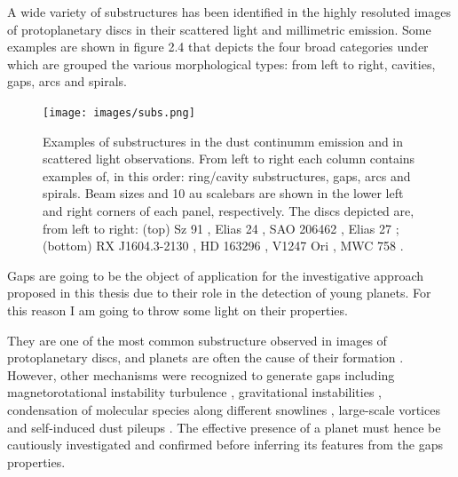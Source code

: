 \documentclass[a4paper,10pt]{report}
\begin{document}

A wide variety of substructures has been identified in the highly resoluted images
of protoplanetary discs in their scattered light and millimetric emission. Some examples are shown 
in figure 2.4 that depicts the four broad categories under which are grouped the various morphological types:
from left to right, cavities, gaps, arcs and spirals.

\begin{figure}
    \begin{center}
        \texttt{[image: images/subs.png]}
    \end{center}
    \caption{Examples of substructures in the dust continumm emission and in scattered light observations.
    From left to right each column contains examples of, in this order: ring/cavity substructures, gaps, arcs and spirals.
    Beam sizes and 10 au scalebars are shown in the lower left and right corners of each panel, respectively.
    The discs depicted are, from left to right: (top) Sz 91 \citep{sub1}, Elias 24 \citep{Andrews_2018}, SAO 206462 \citep{sub3},
    Elias 27 \citep{sub4}; (bottom) RX J1604.3-2130 \citep{subs5}, HD 163296 \citep{subs6}, V1247 Ori \citep{subs7}, MWC 758 \citep{subs8}.}
\end{figure}

Gaps are going to be the object of application for the investigative approach proposed in this thesis due
to their role in the detection of young planets.
For this reason I am going to throw some light on their properties.

They are one of the most common substructure observed in images of protoplanetary discs, and
planets are often the cause of their formation \citep{gap_opening1, gap_opening2, gap_opening3}. However, other mechanisms were recognized to generate gaps
including magnetorotational instability turbulence \citep{MRI}, gravitational instabilities \citep{GI}, condensation of molecular species along different snowlines \citep{cond},
large-scale vortices \citep{vortix} and self-induced dust pileups \citep{dust_pup}. The effective presence of a planet must hence be cautiously investigated and confirmed 
before inferring its features from the gaps properties. 
\end{document}
